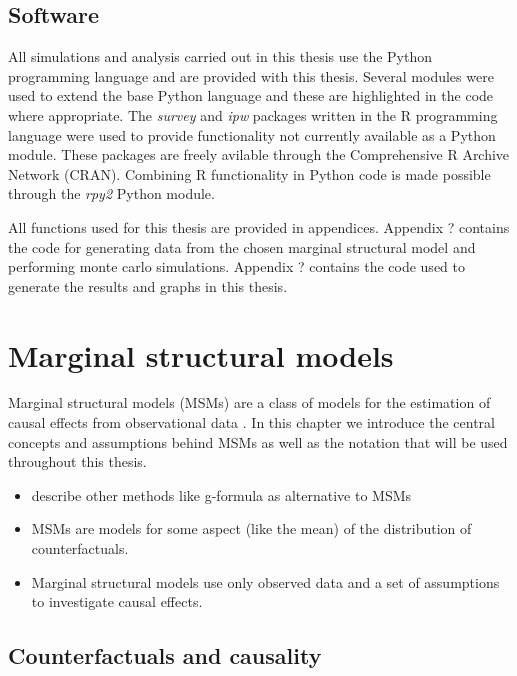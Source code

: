 \documentclass[11pt]{article}
\providecommand{\tightlist}{%
      \setlength{\itemsep}{0pt}\setlength{\parskip}{0pt}}
\begin{document}
    \subsection{Software}\label{software}

All simulations and analysis carried out in this thesis use the Python
programming language and are provided with this thesis. Several modules
were used to extend the base Python language and these are highlighted
in the code where appropriate. The \emph{survey} and \emph{ipw} packages
written in the R programming language were used to provide functionality
not currently available as a Python module. These packages are freely
avilable through the Comprehensive R Archive Network (CRAN). Combining R
functionality in Python code is made possible through the \emph{rpy2}
Python module. \linebreak

All functions used for this thesis are provided in appendices. Appendix
? contains the code for generating data from the chosen marginal
structural model and performing monte carlo simulations. Appendix ?
contains the code used to generate the results and graphs in this
thesis.

    \newpage

    \section{Marginal structural models}\label{marginal-structural-models}

Marginal structural models (MSMs) are a class of models for the
estimation of causal effects from observational data \citet{Robins2000}.
In this chapter we introduce the central concepts and assumptions behind
MSMs as well as the notation that will be used throughout this thesis.

\begin{itemize}
\tightlist
\item
  describe other methods like g-formula as alternative to MSMs
\item
  MSMs are models for some aspect (like the mean) of the distribution of
  counterfactuals.
\item
  Marginal structural models use only observed data and a set of
  assumptions to investigate causal effects.
\end{itemize}

    \subsection{Counterfactuals and
causality}\label{counterfactuals-and-causality}
\end{document}

